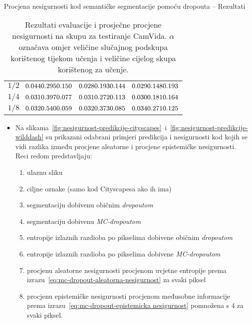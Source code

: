 \documentclass{beamer}
\begin{document}
\begin{frame}[allowframebreaks=0.9]{Procjena nesigurnosti kod semantičke segmentacije pomoću dropouta -- Rezultati}
\begin{table}
\begin{subtable}[t]{1\textwidth}
\begin{tabular}{c rrr}
				$1/2$ 
				& $\hnc{0.044}\;\hnc{0.295}\;\hnc{0.150}$ &  $\hnc{0.028}\;\hnc{0.193}\;\hnc{0.144}$ &  $\hnc{0.029}\;\hnc{0.148}\;\hnc{0.193}$
				\\
				$1/4$ 
				& $\hnc{0.031}\;\hnc{0.397}\;\hnc{0.077}$ &  $\hnc{0.031}\;\hnc{0.272}\;\hnc{0.113}$ &  $\hnc{0.030}\;\hnc{0.181}\;\hnc{0.164}$
				\\
				$1/8$ 
				& $\hnc{0.032}\;\hnc{0.540}\;\hnc{0.059}$ &  $\hnc{0.032}\;\hnc{0.373}\;\hnc{0.085}$ &  $\hnc{0.034}\;\hnc{0.271}\;\hnc{0.125}$
				\\
				\bottomrule
			\end{tabular}			
			\endgroup
			\caption{Prosječna procjena epistemičke nesigurnosti, prosječna procjena aleatorne nesigurnosti i njihov omjer, ovisno o veličini skupa za učenje i broju epoha. Svaka trojka vrijednosti dobivena je jednim mjerenjem.}
			\label{subtab:camvid-nesigurnost-epohe-dijelovi-skupa-za-ucenje}
		\end{subtable}
		\caption{Rezultati evaluacije i prosječne procjene nesigurnosti na skupu za testiranje CamVida. $\alpha$ označava omjer veličine slučajnog podskupa korištenog tijekom učenja i veličine cijelog skupa korištenog za učenje.}
		\label{tab:camvid-nesigurnost-epohe-dijelovi-skupa-za-ucenje}
	\end{table}
\begin{itemize}
	\item Na slikama~\ref{fig:nesigurnost-predikcije-cityscapes}~i~\ref{fig:nesigurnost-predikcije-wilddash} su prikazani odabrani primjeri predikcija i nesigurnosti kod kojih se vidi razlika između procjene aleatorne i procjene epistemičke nesigurnosti. Reci redom predstavljaju:
	\begin{enumerate}
		\item ulaznu sliku
		\item ciljne oznake (samo kod Cityscapesa ako ih ima)
		\item segmentaciju dobivenu običnim \textit{dropoutom}
		\item segmentaciju dobivenu \textit{MC-dropoutom}
		\item entropije izlaznih razdioba po pikselima dobivene običnim \textit{dropoutom}
		\item entropije izlaznih razdioba po pikselima dobivene \textit{MC-dropoutom}
		\item procjenu aleatorne nesigurnosti procjenom uvjetne entropije prema izrazu~\eqref{eq:mc-dropout-aleatorna-nesigurnost} za svaki piksel
		\item procjenu epistemičke nesigurnosti procjenom međusobne informacije prema izrazu~\eqref{eq:mc-dropout-epistemicka nesigurnost} pomnožena s $4$ za svaki piksel.

\end{enumerate}
\end{itemize}
\end{frame}
\end{document}
